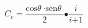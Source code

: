 \begin{equation}
C_c\mathrm{=}\frac{{\mathrm{cos} \theta \ }\mathrm{\cdot }{\mathrm{sen} \theta \ }}{\mathrm{2}}\mathrm{\bullet }\frac{i}{i\mathrm{+1}}
\end{equation}